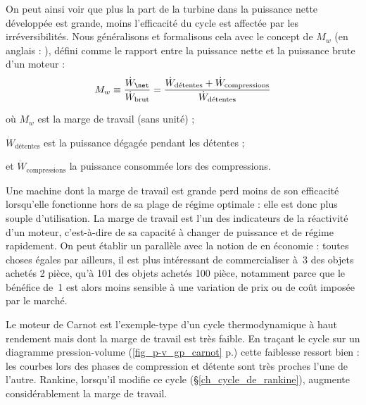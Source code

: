 		On peut ainsi voir que plus la part de la turbine dans la puissance nette développée est grande, moins l’efficacité du cycle est affectée par les irréversibilités. Nous généralisons et formalisons cela avec le concept de  $M_w$ (en anglais : ), défini comme le rapport entre la puissance nette et la puissance brute d’un moteur :
		\begin{equation}
			M_w \equiv 	\frac{\dot W_\net}{\dot W_\text{brut}}	= \frac{\dot W_\text{détentes} + \dot W_\text{compressions}}{\dot W_\text{détentes}}
			\label{eq_marge_travail}
		\end{equation}
		\begin{equationterms}
			\item où \tab $M_w$ 									\tab\tab\tab\tab\tab\tab\tab\tab est la marge de travail (sans unité) ;
			\item \tab $\dot W_\text{détentes}$ 			\tab\tab\tab\tab est la puissance dégagée pendant les détentes ;
			\item et \tab $\dot W_\text{compressions}$ 	\tab la puissance consommée lors des compressions.
		\end{equationterms}

		Une machine dont la marge de travail est grande perd moins de son efficacité lorsqu’elle fonctionne hors de sa plage de régime optimale : elle est donc plus souple d’utilisation. La marge de travail est l’un des indicateurs de la réactivité d’un moteur, c’est-à-dire de sa capacité à changer de puissance et de régime rapidement. On peut établir un parallèle avec la notion de  en économie : toutes choses égales par ailleurs, il est plus intéressant de commercialiser à~\SI{3}{\euroo} des objets achetés \SI{2}{\euroo} pièce, qu’à \SI{101}{\euroo} des objets achetés \SI{100}{\euroo} pièce, notamment parce que le bénéfice de~\SI{1}{\euroo} est alors moins sensible à une variation de prix ou de coût imposée par le marché.
		
			Le moteur de Carnot est l’exemple-type d’un cycle thermodynamique à haut rendement mais dont la marge de travail est très faible. En traçant le cycle sur un diagramme pression-volume (\cref{fig_p-v_gp_carnot} p.\pageref{fig_p-v_gp_carnot}) cette faiblesse ressort bien : les courbes lors des phases de compression et détente sont très proches l’une de l’autre. Rankine, lorsqu’il modifie ce cycle (\S\ref{ch_cycle_de_rankine}), augmente considérablement la marge de travail.

